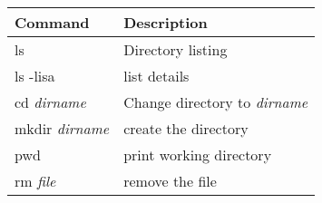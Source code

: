 \begin{longtable}[]{@{}ll@{}}
\toprule
\begin{minipage}[b]{0.26\columnwidth}\raggedright\strut
Command\strut
\end{minipage} & \begin{minipage}[b]{0.50\columnwidth}\raggedright\strut
Description\strut
\end{minipage}\tabularnewline
\midrule
\endhead
\begin{minipage}[t]{0.26\columnwidth}\raggedright\strut
ls\strut
\end{minipage} & \begin{minipage}[t]{0.50\columnwidth}\raggedright\strut
Directory listing\strut
\end{minipage}\tabularnewline
\begin{minipage}[t]{0.26\columnwidth}\raggedright\strut
ls -lisa\strut
\end{minipage} & \begin{minipage}[t]{0.50\columnwidth}\raggedright\strut
list details\strut
\end{minipage}\tabularnewline
\begin{minipage}[t]{0.26\columnwidth}\raggedright\strut
cd \emph{dirname}\strut
\end{minipage} & \begin{minipage}[t]{0.50\columnwidth}\raggedright\strut
Change directory to \emph{dirname}\strut
\end{minipage}\tabularnewline
\begin{minipage}[t]{0.26\columnwidth}\raggedright\strut
mkdir \emph{dirname}\strut
\end{minipage} & \begin{minipage}[t]{0.50\columnwidth}\raggedright\strut
create the directory\strut
\end{minipage}\tabularnewline
\begin{minipage}[t]{0.26\columnwidth}\raggedright\strut
pwd\strut
\end{minipage} & \begin{minipage}[t]{0.50\columnwidth}\raggedright\strut
print working directory\strut
\end{minipage}\tabularnewline
\begin{minipage}[t]{0.26\columnwidth}\raggedright\strut
rm \emph{file}\strut
\end{minipage} & \begin{minipage}[t]{0.50\columnwidth}\raggedright\strut
remove the file\strut
\end{minipage}\tabularnewline

\end{longtable}
